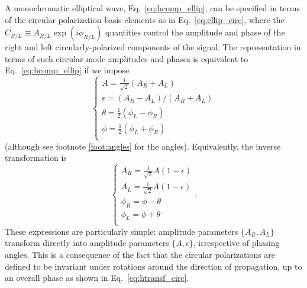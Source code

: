 \documentclass[aps,prd,twocolumn,superscriptaddress,preprintnumbers,floatfix,nofootinbib]{revtex4-2}
\newcommand*{\eq}[1]{Eq.~\eqref{eq:#1}}
\begin{document}
A monochromatic elliptical wave, Eq.~\eqref{eq:hcomp_ellip}, can be specified in terms of the circular polarization basis elements as in \eq{ellip_circ},
where the $C_{R/L} \equiv A_{R/L} \exp(i\phi_{R/L})$ quantities control the amplitude and phase of the right and left circularly-polarized components of the signal.
%
The representation in terms of such circular-mode amplitudes and phases is equivalent to Eq.~\eqref{eq:hcomp_ellip} if we impose
\begin{equation} \label{eq:Cphi_to_Aellip}
\begin{cases}
A = \frac{1}{\sqrt{2}}\left(A_R + A_L\right) \\
\epsilon = (A_R - A_L)/(A_R + A_L) \\ 
\theta = \frac{1}{2}(\phi_L - \phi_R)\\
\phi = \frac{1}{2}(\phi_L + \phi_R)\\
\end{cases} 
\end{equation}
(although see footnote \ref{foot:angles} for the angles).
Equivalently, the inverse transformation is 
\begin{equation} \label{eq:Aellip_to_Cphi}
\begin{cases}
A_R = \frac{1}{\sqrt{2}} A \left(1 + \epsilon\right) \\
A_L = \frac{1}{\sqrt{2}} A \left(1 - \epsilon\right) \\
\phi_R = \phi - \theta \\ 
\phi_L = \phi + \theta \\ 
\end{cases} .
\end{equation}
These expressions are particularly simple: amplitude parameters $\{ A_R, A_L\}$ transform directly into amplitude parameters $\{A, \epsilon\}$, irrespective of phasing angles.
This is a consequence of the fact that the circular polarizations are defined to be invariant under rotations around the direction of propagation, up to an overall phase as shown in \eq{htransf_circ}.
\end{document}
